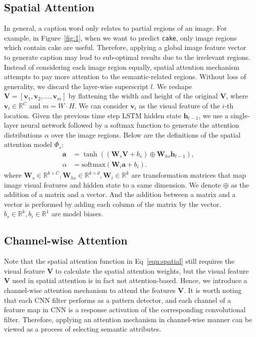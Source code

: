 \documentclass[10pt,twocolumn,letterpaper]{article}
\begin{document}
\subsection{Spatial Attention}\label{sec:spatial}
In general, a caption word only relates to partial regions of an image. For example, in Figure~\ref{fig:1}, when we want to predict \texttt{cake}, only image
regions which contain cake are useful. Therefore, applying a global image feature vector to generate caption may lead to sub-optimal results due to the
irrelevant regions. Instead of considering each image region equally, spatial attention mechanism attempts to pay more attention to the semantic-related
regions. Without loss of generality, we discard the layer-wise superscript $l$. We reshape $\mathbf{V}  = \left[\mathbf{v}_1, \mathbf{v}_2, ..., \mathbf{v}_m
\right]$ by flattening the width and height of the original $\mathbf{V}$, where $\mathbf{v}_i\in\mathbb{R}^C$ and $m=W\cdot H$. We can consider $\mathbf{v}_i$
as the visual feature of the $i$-th location. Given the previous time step LSTM hidden state $\mathbf{h}_{t-1}$, we use a single-layer neural network followed
by a softmax function to generate the attention distributions $\alpha$ over the image regions. Below are the definitions of the spatial attention model
$\Phi_s$:
\begin{equation} \label{equ:S}
\begin{split}
\mathbf{a} & = \tanh \left( \left( \mathbf{W}_s \mathbf{V} + b_s \right) \oplus \mathbf{W}_{hs}\mathbf{h}_{t-1}\right), \\
\alpha & = \textrm{softmax} \left( \mathbf{W}_i \mathbf{a} + b_i \right).
\end{split}
\end{equation}
where $\mathbf{W}_s \in \mathbb{R}^{k \times C}, \mathbf{W}_{hs} \in \mathbb{R}^{k \times d}, \mathbf{W}_i \in \mathbb{R}^k$ are transformation matrices that
map image visual features and hidden state to a same dimension. We denote $\oplus$ as the addition of a matrix and a vector. And the addition between a matrix
and a vector is performed by adding each column of the matrix by the vector. $b_s \in \mathbb{R}^k, b_i \in \mathbb{R}^1$ are model biases.

\subsection{Channel-wise Attention}\label{sec:channel}
Note that the spatial attention function in Eq~\eqref{equ:spatial} still requires the visual feature $\mathbf{V}$ to calculate the spatial attention weights,
but the visual feature $\mathbf{V}$ used in spatial attention is in fact not attention-based. Hence, we introduce a channel-wise attention mechanism to attend
the features $\mathbf{V}$. It is worth noting that each CNN filter performs as a pattern detector, and each channel of a feature map in CNN is a response
activation of the corresponding convolutional filter. Therefore, applying an attention mechanism in channel-wise manner can be viewed as a process of
selecting semantic attributes.
\end{document}
